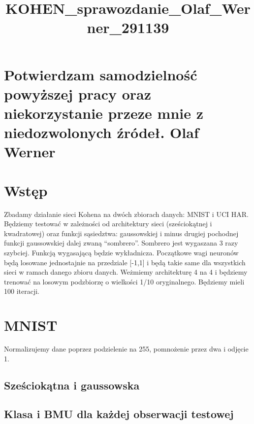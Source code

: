 \documentclass[11pt]{article}
\title{KOHEN\_sprawozdanie\_Olaf\_Werner\_291139}
\begin{document}
    
    
    \maketitle
    
    

    
    \hypertarget{potwierdzam-samodzielnoux15bux107-powyux17cszej-pracy-oraz-niekorzystanie-przeze-mnie-z-niedozwolonych-ux17aruxf3deux142.-olaf-werner}{%
\section{Potwierdzam samodzielność powyższej pracy oraz niekorzystanie
przeze mnie z niedozwolonych źródeł. Olaf
Werner}\label{potwierdzam-samodzielnoux15bux107-powyux17cszej-pracy-oraz-niekorzystanie-przeze-mnie-z-niedozwolonych-ux17aruxf3deux142.-olaf-werner}}

    \hypertarget{wstux119p}{%
\section{Wstęp}\label{wstux119p}}

    Zbadamy działanie sieci Kohena na dwóch zbiorach danych: MNIST i UCI
HAR. Będziemy testować w zależności od architektury sieci (sześciokątnej
i kwadratowej) oraz funkcji sąsiedztwa: gaussowskiej i minus drugiej
pochodnej funkcji gaussowskiej dalej zwaną ``sombrero''. Sombrero jest
wygaszana 3 razy szybciej. Funkcją wygasającą będzie wykładnicza.
Początkowe wagi neuronów będą losowane jednostajnie na przedziale
{[}-1,1{]} i będą takie same dla wszystkich sieci w ramach danego zbioru
danych. Weżmiemy architekturę 4 na 4 i będziemy trenować na losowym
podzbiorzę o wielkości 1/10 oryginalnego. Będziemy mieli 100 iteracji.

    \hypertarget{mnist}{%
\section{MNIST}\label{mnist}}

    Normalizujemy dane poprzez podzielenie na 255, pomnożenie przez dwa i
odjęcie 1.

    \hypertarget{szeux15bciokux105tna-i-gaussowska}{%
\subsection{Sześciokątna i
gaussowska}\label{szeux15bciokux105tna-i-gaussowska}}

    \hypertarget{klasa-i-bmu-dla-kaux17cdej-obserwacji-testowej}{%
\subsection{Klasa i BMU dla każdej obserwacji
testowej}\label{klasa-i-bmu-dla-kaux17cdej-obserwacji-testowej}}
\end{document}
